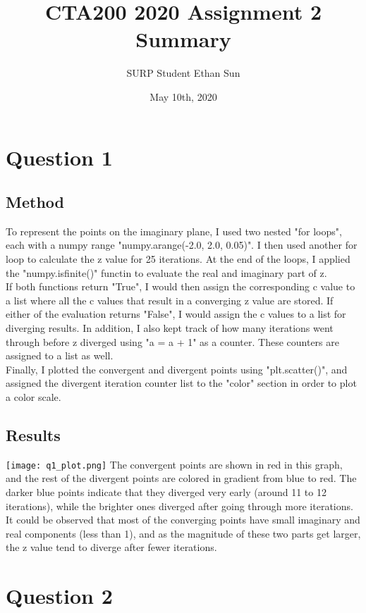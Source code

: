 \documentclass{article}
\title{CTA200 2020 Assignment 2 Summary}
\author{SURP Student Ethan Sun}
\date{May 10th, 2020}
\begin{document}
\maketitle

\section*{Question 1}
\subsection*{Method}
To represent the points on the imaginary plane, I used two nested "for loops", each with a numpy range "numpy.arange(-2.0, 2.0, 0.05)". I then used another for loop to calculate the z value for 25 iterations. At the end of the loops, I applied the "numpy.isfinite()" functin to evaluate the real and imaginary part of z.
 \\
If both functions return "True", I would then assign the corresponding c value to a list where all the c values that result in a converging z value are stored. If either of the evaluation returns "False", I would assign the c values to a list for diverging results. In addition, I also kept track of how many iterations went through before z diverged using "a = a + 1" as a counter. These counters are assigned to a list as well.
 \\
Finally, I plotted the convergent and divergent points using "plt.scatter()", and assigned the divergent iteration counter list to the "color" section in order to plot a color scale.
\newpage
\subsection*{Results}
\texttt{[image: q1\_plot.png]}
The convergent points are shown in red in this graph, and the rest of the divergent points are colored in gradient from blue to red. The darker blue points indicate that they diverged very early (around 11 to 12 iterations), while the brighter ones diverged after going through more iterations. It could be observed that most of the converging points have small imaginary and real components (less than 1), and as the magnitude of these two parts get larger, the z value tend to diverge after fewer iterations.
\newpage

\section*{Question 2}
\end{document}
